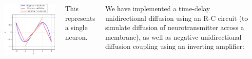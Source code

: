 \documentclass[25pt, a0paper, landscape, fleqn]{tikzposter}
\begin{document}
\begin{columns}
{\begin{minipage}[b]{0.1\pagewidth}
\begin{tikzfigure}[Nullclines]
      \includegraphics[width = 0.1\pagewidth]{./Figures/Nullclines/Nullclines.pdf}
    \end{tikzfigure}
  \end{minipage}

  This represents a single neuron.

  We have implemented a time-delay unidirectional diffusion using an R-C circuit (to simulate diffusion of neurotransmitter across a membrane), as well as negative unidirectional diffusion coupling using an inverting amplifier:

}
\end{columns}
\end{document}
